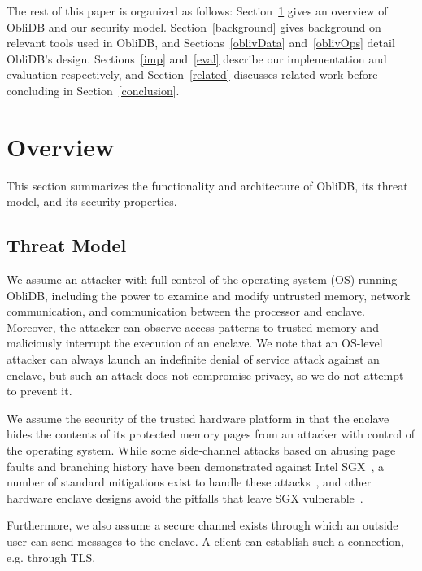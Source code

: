 \documentclass[letterpaper,twocolumn,10pt]{article}
\newcommand{\ignore}[1]{}
\def\name/{ObliDB}
\begin{document}
The rest of this paper is organized as follows: Section~\ref{model} gives an overview of \name/ and our security model. Section~\ref{background} gives background on relevant tools used in \name/, and Sections~\ref{oblivData} and~\ref{oblivOps} detail \name/'s design. Sections~\ref{imp} and~\ref{eval} describe our implementation and evaluation respectively, and Section~\ref{related} discusses related work before concluding in Section~\ref{conclusion}.

\section{Overview}\label{model}
This section summarizes the functionality and architecture of \name/, its threat model, and its security properties.

\subsection{Threat Model}
We assume an attacker with full control of the operating system (OS) running \name/, including the power to examine and modify untrusted memory, network communication, and communication between the processor and enclave. Moreover, the attacker can observe access patterns to trusted memory and maliciously  interrupt the execution of an enclave. We note that an OS-level attacker can always launch an indefinite denial of service attack against an enclave, but such an attack does not compromise privacy, so we do not attempt to prevent it.

We assume the security of the trusted hardware platform in that the enclave hides the contents of its protected memory pages from an attacker with control of the operating system. While some side-channel attacks based on abusing page faults and branching history have been demonstrated against Intel SGX~\cite{LSG+16,XCP15}, a number of standard mitigations exist to handle these attacks~\cite{SCNS16,RLT15,SLK+17,SLKP17}, and other hardware enclave designs avoid the pitfalls that leave SGX vulnerable~\cite{CLD16, LHM+15, MLS+13}.

Furthermore, we also assume a secure channel exists through which an outside user can send messages to the enclave. A client can establish such a connection, e.g. through TLS. \ignore{ (this is fairly straightforward with SGX), but we did not implement this for our tests, as it is not directly related to the functionality provided by \name/.}
\end{document}
